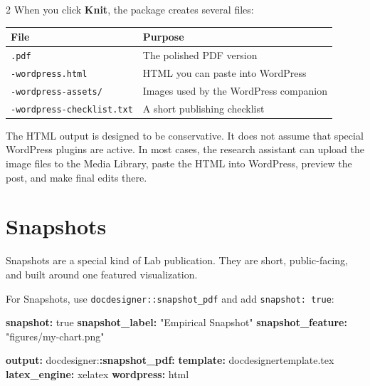 \documentclass[12pt]{article}
\newenvironment{Shaded}{\begin{snugshade}}{\end{snugshade}}
\newcommand{\AttributeTok}[1]{\textcolor[rgb]{0.13,0.29,0.53}{#1}}
\newcommand{\CharTok}[1]{\textcolor[rgb]{0.31,0.60,0.02}{#1}}
\newcommand{\FunctionTok}[1]{\textcolor[rgb]{0.13,0.29,0.53}{\textbf{#1}}}
\newcommand{\KeywordTok}[1]{\textcolor[rgb]{0.13,0.29,0.53}{\textbf{#1}}}
\newcommand{\StringTok}[1]{\textcolor[rgb]{0.31,0.60,0.02}{#1}}
\renewenvironment{Shaded}{%
    \vspace{3pt}%
    \noindent\begin{minipage}{\linewidth}%
    \def\FrameCommand{%
      \hspace{1pt}%
      {\color{docdesignerrule}\vrule width 3pt}%
      \hspace{4pt}%
      \colorbox{codeinputbg}%
    }%
    \MakeFramed{\advance\hsize by -\width \FrameRestore}%
    \footnotesize
    \setlength{\parskip}{0pt}%
    \setlength{\partopsep}{0pt}%
  }{%
    \endMakeFramed
    \end{minipage}%
    \vspace{3pt}%
  }
\def\FrameCommand{\fboxsep=4pt\colorbox{codeoutputbg}}%
\begin{document}
\begin{multicols}{2}
When you click \textbf{Knit}, the package creates several files:

{\def\LTcaptype{} %
\begin{longtable}[]{@{}ll@{}}
\toprule\noalign{}
File & Purpose \\
\midrule\noalign{}
\endhead
\bottomrule\noalign{}
\endlastfoot
\texttt{.pdf} & The polished PDF version \\
\texttt{-wordpress.html} & HTML you can paste into WordPress \\
\texttt{-wordpress-assets/} & Images used by the WordPress companion \\
\texttt{-wordpress-checklist.txt} & A short publishing checklist \\
\end{longtable}
}

The HTML output is designed to be conservative. It does not assume that
special WordPress plugins are active. In most cases, the research
assistant can upload the image files to the Media Library, paste the
HTML into WordPress, preview the post, and make final edits there.

\section{Snapshots}\label{snapshots}

Snapshots are a special kind of Lab publication. They are short,
public-facing, and built around one featured visualization.

For Snapshots, use \texttt{docdesigner::snapshot\_pdf} and add
\texttt{snapshot:\ true}:

\begin{Shaded}
\begin{Highlighting}[]
\FunctionTok{snapshot}\KeywordTok{:}\AttributeTok{ }\CharTok{true}
\FunctionTok{snapshot\_label}\KeywordTok{:}\AttributeTok{ }\StringTok{"Empirical Snapshot"}
\FunctionTok{snapshot\_feature}\KeywordTok{:}\AttributeTok{ }\StringTok{"figures/my{-}chart.png"}

\FunctionTok{output}\KeywordTok{:}
\AttributeTok{  docdesigner:}\FunctionTok{:snapshot\_pdf}\KeywordTok{:}
\AttributeTok{    }\FunctionTok{template}\KeywordTok{:}\AttributeTok{ docdesignertemplate.tex}
\AttributeTok{    }\FunctionTok{latex\_engine}\KeywordTok{:}\AttributeTok{ xelatex}
\AttributeTok{    }\FunctionTok{wordpress}\KeywordTok{:}\AttributeTok{ html}
\end{Highlighting}
\end{Shaded}


\end{multicols}
\end{document}
